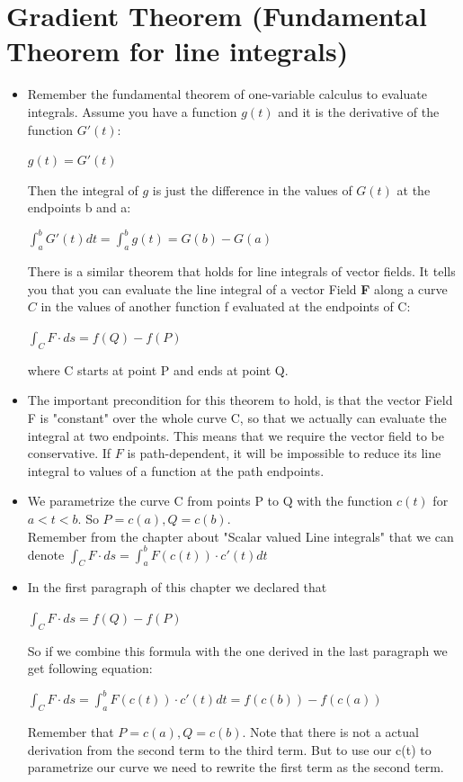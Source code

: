 \documentclass[12pt,a4paper]{article}
\begin{document}
	\newpage
	
	\section{Gradient Theorem (Fundamental Theorem for line integrals)}
	
	\begin{itemize}
		\item Remember the fundamental theorem of one-variable calculus to evaluate integrals. Assume you have a function $g(t)$ and it is the derivative of the function $G'(t)$:\\
		\begin{center}
			$g(t) = G'(t)$
		\end{center}
		Then the integral of $g$ is just the difference in the values of $G(t)$ at the endpoints b and a:\\
		\begin{center}
			$\int_{a}^{b} G'(t) dt =\int_{a}^{b} g(t) = G(b) - G(a)$
		\end{center}
		There is a similar theorem that holds for line integrals of vector fields. It tells you that you can evaluate the line integral of a vector Field \textbf{F} along a curve $C$ in the values of another function f evaluated at the endpoints of C:\\
		\begin{center}
			$\int_{C}^{}F \cdot ds = f(Q) - f(P)$
		\end{center}
		where C starts at point P and ends at point Q. 
		
		\item The important precondition for this theorem to hold, is that the vector Field F is "constant" over the whole curve C, so that we actually can evaluate the integral at two endpoints. This means that we require the vector field to be conservative. If $F$ is path-dependent, it will be impossible to reduce its line integral to values of a function at the path endpoints. 
		
		\item We parametrize the curve C from points P to Q with the function $c(t)$ for $a < t < b$. So $P = c(a), Q = c(b)$. \\
		Remember from the chapter about "Scalar valued Line integrals" that we can denote $\int_{C}^{} F\cdot ds = \int_{a}^{b} F(c(t))\cdot c'(t) dt$
		
		\item In the first paragraph of this chapter we declared that\\
		\begin{center}
			$\int_{C}^{}F \cdot ds = f(Q) - f(P)$
		\end{center}
		So if we combine this formula with the one derived in the last paragraph we get following equation:\\
		\begin{center}
			$\int_{C}^{}F \cdot ds = \int_{a}^{b} F(c(t)) \cdot c'(t)dt = f(c(b)) - f(c(a))$
		\end{center}
		Remember that $P = c(a), Q = c(b)$. Note that there is not a actual derivation from the second term to the third term. But to use our c(t) to parametrize our curve we need to rewrite the first term as the second term.
		

\end{itemize}
\end{document}
